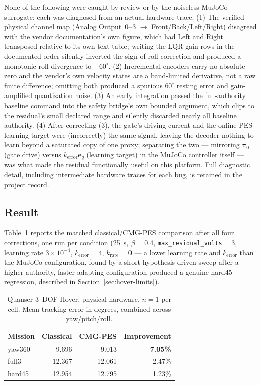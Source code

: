 \documentclass[10pt,twocolumn]{article}
\begin{document}
None of the following were caught by review or by the noiseless MuJoCo
surrogate; each was diagnosed from an actual hardware trace. (1) The
verified physical channel map (Analog Output~0--3 $\rightarrow$
Front/Back/Left/Right) disagreed with the vendor documentation's own
figure, which had Left and Right transposed relative to its own text table;
writing the LQR gain rows in the documented order silently inverted the sign
of roll correction and produced a monotonic roll divergence to $-60^\circ$.
(2) Incremental encoders carry no absolute zero and the vendor's own velocity
states are a band-limited derivative, not a raw finite difference; omitting
both produced a spurious $60^\circ$ resting error and gain-amplified
quantization noise. (3) An early integration passed the full-authority
baseline command into the safety bridge's own bounded argument, which clips
to the residual's small declared range and silently discarded nearly all
baseline authority. (4) After correcting (3), the gate's driving current and
the online-PES learning target were (incorrectly) the same signal, leaving
the decoder nothing to learn beyond a saturated copy of one proxy; separating
the two --- mirroring $\bm\tau_0$ (gate drive) versus
$k_{\mathrm{error}}\bm e_q$ (learning target) in the MuJoCo controller itself
--- was what made the residual functionally useful on this platform. Full
diagnostic detail, including intermediate hardware traces for each bug, is
retained in the project record.

\subsection{Result}

Table~\ref{tab:hover} reports the matched classical/CMG-PES comparison after
all four corrections, one run per condition (25~s, $\beta=0.4$,
\texttt{max\_residual\_volts}$=3$, learning rate $3\times10^{-4}$,
$k_{\mathrm{error}}=4$, $k_{\mathrm{rate}}=0$ --- a lower learning rate and
$k_{\mathrm{error}}$ than the MuJoCo configuration, found by a short
hypothesis-driven sweep after a higher-authority, faster-adapting
configuration produced a genuine hard45 regression, described in
Section~\ref{sec:hover-limits}).

\begin{table}[t]
\centering
\caption{Quanser 3~DOF Hover, physical hardware, $n=1$ per cell. Mean
tracking error in degrees, combined across yaw/pitch/roll.}
\label{tab:hover}
\small
\begin{tabular}{lrrr}
\toprule
Mission & Classical & CMG-PES & Improvement \\
\midrule
yaw360 & 9.696 & 9.013  & \textbf{7.05\%} \\
full3  & 12.367 & 12.061 & 2.47\% \\
hard45 & 12.954 & 12.795 & 1.23\% \\
\bottomrule
\end{tabular}
\end{table}
\end{document}
